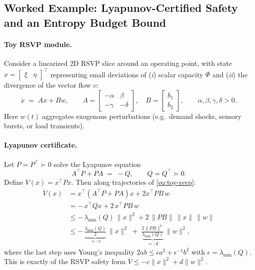 \documentclass[12pt]{article}
\begin{document}
\subsection*{Worked Example: Lyapunov-Certified Safety and an Entropy Budget Bound}

\paragraph{Toy RSVP module.}
Consider a linearized 2D RSVP slice around an operating point, with state
$x=\begin{bmatrix}\xi & \eta\end{bmatrix}^\top$ representing small deviations of
(\emph{i}) scalar capacity $\Phi$ and (\emph{ii}) the divergence of the vector flow $v$:
\begin{equation}
\dot x \;=\; A x + B w, 
\qquad
A=\begin{bmatrix}
-\alpha & \beta\\
-\gamma & -\delta
\end{bmatrix},\quad
B=\begin{bmatrix}
b_1\\ b_2
\end{bmatrix},
\qquad \alpha,\beta,\gamma,\delta>0 .
\label{eq:toy-rsvp}
\end{equation}
Here $w(t)$ aggregates exogenous perturbations (e.g.\ demand shocks, sensory bursts, or load transients).

\paragraph{Lyapunov certificate.}
Let $P=P^\top\succ0$ solve the Lyapunov equation
\begin{equation}
A^\top P + P A \;=\; -Q,
\qquad Q=Q^\top\succ0 .
\end{equation}
Define $V(x)=x^\top P x$. Then along trajectories of \eqref{eq:toy-rsvp}:
\begin{align}
\dot V(x)
&= x^\top(A^\top P + P A)x + 2x^\top P B\,w \nonumber\\
&= -\,x^\top Q x + 2\,x^\top P B\,w \nonumber\\
&\le -\,\lambda_{\min}(Q)\,\|x\|^2 + 2\,\|P B\|\,\|x\|\,\|w\| \nonumber\\
&\le -\,\underbrace{\tfrac{\lambda_{\min}(Q)}{2}}_{=:c}\,\|x\|^2
\;+\;\underbrace{\frac{2\|P B\|^2}{\lambda_{\min}(Q)}}_{=:d}\,\|w\|^2 ,
\label{eq:Vdot-bound}
\end{align}
where the last step uses Young’s inequality $2ab\le \epsilon a^2 + \epsilon^{-1} b^2$ with $\epsilon=\lambda_{\min}(Q)$.
This is exactly of the RSVP safety form $\dot V \le -c\|x\|^2 + d\|w\|^2$.
\end{document}
